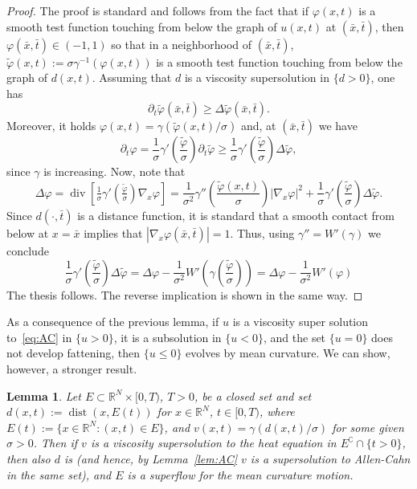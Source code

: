 \documentclass[10pt]{amsart}
\theoremstyle{plain}
\newtheorem{lemma}[theorem]{Lemma}
\theoremstyle{definition}
\DeclareMathOperator{\Div}{div}
\newcommand{\R}{\mathbb{R}}
\newcommand{\comp}[1]{{#1}^\complement}
\DeclareMathOperator{\dist}{dist}
\numberwithin{equation}{section}
\begin{document}
\begin{proof}
The proof is standard and follows from the fact that if $\varphi(x,t)$
is  a smooth test function touching from below the graph of $u(x,t)$
at $(\bar x,\bar t)$, then $\varphi(\bar x,\bar t)\in (-1,1)$ so that
in a neighborhood of $(\bar x,\bar t)$, $\tilde\varphi(x,t):= \sigma\gamma^{-1}( \varphi(x,t))$ is a smooth
test function touching from below the graph of $d(x,t)$. Assuming that $d$ is a viscosity supersolution in $\{d>0\}$, one has
\[
\partial_t\tilde\varphi(\bar x,\bar t)\ge \Delta\tilde\varphi(\bar x,\bar t).
\]
Moreover, it holds   $\varphi(x,t)=\gamma(\tilde{\varphi}(x,t)/\sigma)$ and, at  $(\bar x,\bar t)$ we have 
\[\partial_t \varphi=\frac{1}{\sigma}\gamma'\left(\frac{\tilde \varphi}{\sigma}\right)\partial_t \tilde \varphi
\ge \frac{1}{\sigma}\gamma'\left(\frac{\tilde \varphi}{\sigma}\right)\Delta \tilde\varphi,
\]
since $\gamma$ is increasing. Now, note that 
\[
\Delta \varphi = \Div \left[\tfrac{1}{\sigma}\gamma'(\tfrac{\tilde \varphi}{\sigma})\nabla_x \varphi\right]
= \frac{1}{\sigma^2}\gamma''\left(\frac{\tilde \varphi(x,t)}{\sigma}\right)|\nabla_x \varphi|^2
+
\frac{1}{\sigma}\gamma'\left(\frac{\tilde \varphi}{\sigma}\right)\Delta \tilde \varphi.
\]
Since $d(\cdot,\bar t)$ is a distance function, it is standard that 
a smooth contact from below at $x=\bar x$ implies that
$|\nabla_x \varphi(\bar x,\bar t)|= 1$. Thus, using
$\gamma''=W'(\gamma)$ we conclude 
\[
\frac{1}{\sigma}\gamma'\left(\frac{\tilde \varphi}{\sigma}\right)\Delta \tilde\varphi = 
\Delta\varphi - \frac{1}{\sigma^2}W'\left(\gamma\left(\frac{\tilde \varphi}{\sigma}\right)\right)
= \Delta\varphi - \frac{1}{\sigma^2}W'(\varphi)
\]
The thesis follows. The reverse implication is shown in the same way.
\end{proof}
As a consequence of the previous lemma, if $u$ is a viscosity
super solution to~\eqref{eq:AC} in $\{u>0\}$, it is  a subsolution in $\{u<0\}$, and the set $\{u=0\}$ does not develop fattening, then $\{u\le 0\}$
evolves by mean curvature. 
We can show, however, a stronger result.
\begin{lemma}\label{lem:AC-heat}
Let $E\subset \R^N\times [0,T)$, $T>0$, be a closed set
and set $d(x,t):= \dist(x,E(t))$ for $x\in \R^N$, $t\in [0,T)$,
where $E(t) := \{x\in \R^N: (x,t)\in E\}$,
and $v(x,t)=\gamma(d(x,t)/\sigma)$ for some given $\sigma>0$.
Then if $v$ is a viscosity supersolution to the
heat equation in $\comp{E} \cap \{t>0\}$, then 
also $d$ is (and hence, by Lemma~\ref{lem:AC} $v$
is a supersolution to Allen-Cahn in the same set), 
and $E$ is a 
superflow for the mean curvature motion. 
\end{lemma}
\end{document}

